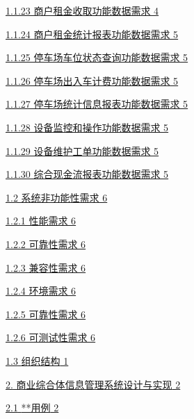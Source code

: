 \documentclass[]{article}
\begin{document}
\protect\hyperlink{ux5546ux6237ux79dfux91d1ux6536ux53d6ux529fux80fdux6570ux636eux9700ux6c42}{1.1.23
  商户租金收取功能数据需求 4}

\protect\hyperlink{ux5546ux6237ux79dfux91d1ux7edfux8ba1ux62a5ux8868ux529fux80fdux6570ux636eux9700ux6c42}{1.1.24
  商户租金统计报表功能数据需求 5}

\protect\hyperlink{ux505cux8f66ux573aux8f66ux4f4dux72b6ux6001ux67e5ux8be2ux529fux80fdux6570ux636eux9700ux6c42}{1.1.25
  停车场车位状态查询功能数据需求 5}

\protect\hyperlink{ux505cux8f66ux573aux51faux5165ux8f66ux8ba1ux8d39ux529fux80fdux6570ux636eux9700ux6c42}{1.1.26
  停车场出入车计费功能数据需求 5}

\protect\hyperlink{ux505cux8f66ux573aux7edfux8ba1ux4fe1ux606fux62a5ux8868ux529fux80fdux6570ux636eux9700ux6c42}{1.1.27
  停车场统计信息报表功能数据需求 5}

\protect\hyperlink{ux8bbeux5907ux76d1ux63a7ux548cux64cdux4f5cux529fux80fdux6570ux636eux9700ux6c42}{1.1.28
  设备监控和操作功能数据需求 5}

\protect\hyperlink{ux8bbeux5907ux7ef4ux62a4ux5de5ux5355ux529fux80fdux6570ux636eux9700ux6c42}{1.1.29
  设备维护工单功能数据需求 5}

\protect\hyperlink{ux7efcux5408ux73b0ux91d1ux6d41ux62a5ux8868ux529fux80fdux6570ux636eux9700ux6c42}{1.1.30
  综合现金流报表功能数据需求 5}

\protect\hyperlink{ux7cfbux7edfux975eux529fux80fdux6027ux9700ux6c42}{1.2
  系统非功能性需求 6}

\protect\hyperlink{ux6027ux80fdux9700ux6c42}{1.2.1 性能需求 6}

\protect\hyperlink{ux53efux9760ux6027ux9700ux6c42}{1.2.2 可靠性需求 6}

\protect\hyperlink{ux517cux5bb9ux6027ux9700ux6c42}{1.2.3 兼容性需求 6}

\protect\hyperlink{ux73afux5883ux9700ux6c42}{1.2.4 环境需求 6}

\protect\hyperlink{ux53efux9760ux6027ux9700ux6c42-1}{1.2.5 可靠性需求 6}

\protect\hyperlink{ux53efux6d4bux8bd5ux6027ux9700ux6c42}{1.2.6
  可测试性需求 6}

\protect\hyperlink{_Toc77076515}{{1.3} {组织结构} 1}

\protect\hyperlink{ux5546ux4e1aux7efcux5408ux4f53ux4fe1ux606fux7ba1ux7406ux7cfbux7edfux8bbeux8ba1ux4e0eux5b9eux73b0}{{2.}
商业综合体信息管理{系统设计与实现} 2}

\protect\hyperlink{ux7528ux6237ux7528ux4f8b}{{2.1} {**用例} 2}
\end{document}
